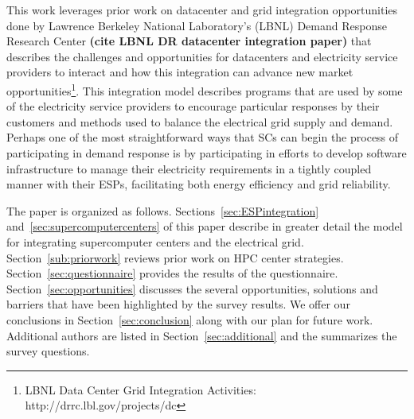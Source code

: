 This work leverages prior work on datacenter and grid integration opportunities
done by Lawrence Berkeley National Laboratory's (LBNL) Demand Response 
Research Center \textbf{(cite LBNL DR datacenter integration paper)}
that describes the challenges and opportunities for datacenters and electricity
service providers to interact and how this integration can advance 
new market 
opportunities\footnote{LBNL Data Center Grid Integration Activities: http://drrc.lbl.gov/projects/dc}.
This integration model describes programs that are used by some of the electricity 
service providers to encourage particular responses by their customers and methods 
used to balance the electrical grid supply and demand.
Perhaps one of the most straightforward ways that SCs can begin
the process of participating in demand response is by participating in efforts to
develop software
infrastructure to manage their electricity requirements in a tightly coupled manner 
with their ESPs, facilitating both energy efficiency and grid reliability.

The paper is organized as follows.
Sections~\ref{sec:ESPintegration} and~\ref{sec:supercomputercenters} of this paper
describe in greater detail the model for 
integrating supercomputer centers and the electrical grid.
Section~\ref{sub:priorwork}
reviews prior work on HPC center strategies. Section~\ref{sec:questionnaire}
provides the results of the questionnaire. 
Section~\ref{sec:opportunities} 
discusses the several opportunities, solutions and barriers that have been highlighted
by the survey results. We offer our conclusions in Section~\ref{sec:conclusion} along with our plan for future work.  Additional authors are listed in Section~\ref{sec:additional} and
the  summarizes the survey questions.

